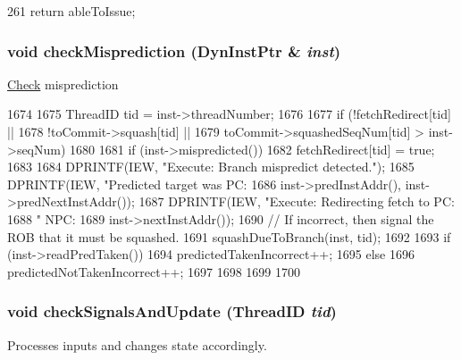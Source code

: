 \begin{DoxyCode}
261 { return ableToIssue; }
\end{DoxyCode}
\hypertarget{classDefaultIEW_aa2a3a423cd0b79a85083da555c98f0f3}{
\subsubsection[{checkMisprediction}]{\setlength{\rightskip}{0pt plus 5cm}void checkMisprediction ({\bf DynInstPtr} \& {\em inst})}}
\label{classDefaultIEW_aa2a3a423cd0b79a85083da555c98f0f3}
\hyperlink{classCheck}{Check} misprediction 


\begin{DoxyCode}
1674 {
1675     ThreadID tid = inst->threadNumber;
1676 
1677     if (!fetchRedirect[tid] ||
1678         !toCommit->squash[tid] ||
1679         toCommit->squashedSeqNum[tid] > inst->seqNum) {
1680 
1681         if (inst->mispredicted()) {
1682             fetchRedirect[tid] = true;
1683 
1684             DPRINTF(IEW, "Execute: Branch mispredict detected.\n");
1685             DPRINTF(IEW, "Predicted target was PC:%
1686                     inst->predInstAddr(), inst->predNextInstAddr());
1687             DPRINTF(IEW, "Execute: Redirecting fetch to PC: %
1688                     " NPC: %
1689                     inst->nextInstAddr());
1690             // If incorrect, then signal the ROB that it must be squashed.
1691             squashDueToBranch(inst, tid);
1692 
1693             if (inst->readPredTaken()) {
1694                 predictedTakenIncorrect++;
1695             } else {
1696                 predictedNotTakenIncorrect++;
1697             }
1698         }
1699     }
1700 }
\end{DoxyCode}
\hypertarget{classDefaultIEW_a4e0fecf6356ab23b6af3043c519b3f31}{
\subsubsection[{checkSignalsAndUpdate}]{\setlength{\rightskip}{0pt plus 5cm}void checkSignalsAndUpdate ({\bf ThreadID} {\em tid})}}
\label{classDefaultIEW_a4e0fecf6356ab23b6af3043c519b3f31}
Processes inputs and changes state accordingly. 


